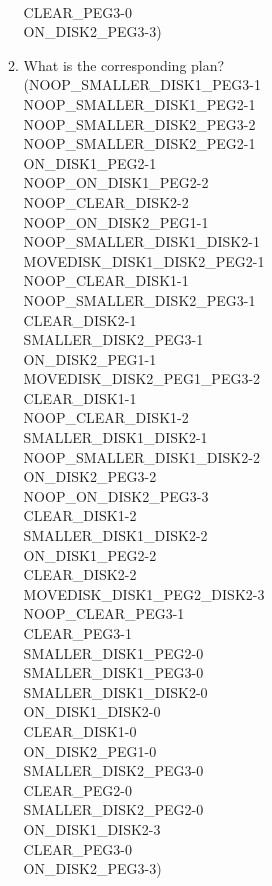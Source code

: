 \documentclass[12pt,letterpaper]{ntdhw}
\begin{document}
\begin{enumerate}
\begin{enumerate}
\\CLEAR\_PEG3\mbox{-}0 
\\ON\_DISK2\_PEG3\mbox{-}3)
\item What is the corresponding plan?
  \\(NOOP\_SMALLER\_DISK1\_PEG3\mbox{-}1 
\\NOOP\_SMALLER\_DISK1\_PEG2\mbox{-}1 
\\NOOP\_SMALLER\_DISK2\_PEG3\mbox{-}2
\\NOOP\_SMALLER\_DISK2\_PEG2\mbox{-}1 
\\ON\_DISK1\_PEG2\mbox{-}1 
\\NOOP\_ON\_DISK1\_PEG2\mbox{-}2
\\NOOP\_CLEAR\_DISK2\mbox{-}2
\\NOOP\_ON\_DISK2\_PEG1\mbox{-}1
\\NOOP\_SMALLER\_DISK1\_DISK2\mbox{-}1
\\MOVEDISK\_DISK1\_DISK2\_PEG2\mbox{-}1
\\NOOP\_CLEAR\_DISK1\mbox{-}1
\\NOOP\_SMALLER\_DISK2\_PEG3\mbox{-}1
\\CLEAR\_DISK2\mbox{-}1
\\SMALLER\_DISK2\_PEG3\mbox{-}1
\\ON\_DISK2\_PEG1\mbox{-}1 
\\MOVEDISK\_DISK2\_PEG1\_PEG3\mbox{-}2
\\CLEAR\_DISK1\mbox{-}1
\\NOOP\_CLEAR\_DISK1\mbox{-}2 
\\SMALLER\_DISK1\_DISK2\mbox{-}1
\\NOOP\_SMALLER\_DISK1\_DISK2\mbox{-}2 
\\ON\_DISK2\_PEG3\mbox{-}2 
\\NOOP\_ON\_DISK2\_PEG3\mbox{-}3 
\\CLEAR\_DISK1\mbox{-}2
\\SMALLER\_DISK1\_DISK2\mbox{-}2
\\ON\_DISK1\_PEG2\mbox{-}2 
\\CLEAR\_DISK2\mbox{-}2 
\\MOVEDISK\_DISK1\_PEG2\_DISK2\mbox{-}3 
\\NOOP\_CLEAR\_PEG3\mbox{-}1
\\CLEAR\_PEG3\mbox{-}1 
\\SMALLER\_DISK1\_PEG2\mbox{-}0
\\SMALLER\_DISK1\_PEG3\mbox{-}0 
\\SMALLER\_DISK1\_DISK2\mbox{-}0 
\\ON\_DISK1\_DISK2\mbox{-}0 
\\CLEAR\_DISK1\mbox{-}0
\\ON\_DISK2\_PEG1\mbox{-}0 
\\SMALLER\_DISK2\_PEG3\mbox{-}0
\\CLEAR\_PEG2\mbox{-}0 
\\SMALLER\_DISK2\_PEG2\mbox{-}0
\\ON\_DISK1\_DISK2\mbox{-}3 
\\CLEAR\_PEG3\mbox{-}0 
\\ON\_DISK2\_PEG3\mbox{-}3)
    \end{enumerate}


\end{enumerate}
\end{document}
